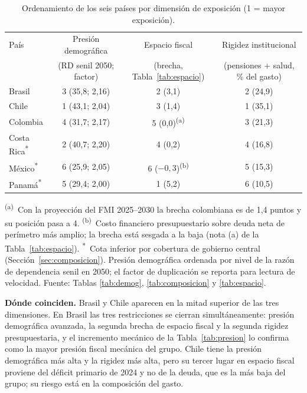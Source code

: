 \documentclass[12pt, letterpaper]{article}
\begin{document}
\begin{table}[htbp]
  \centering
  \caption{Ordenamiento de los seis países por dimensión de exposición (1 = mayor
  exposición).}
  \label{tab:sintesis}
  \small
  \begin{tabular}{lccc}
    \toprule
    País & Presión demográfica & Espacio fiscal & Rigidez institucional \\
         & (RD senil 2050; factor) & (brecha, Tabla~\ref{tab:espacio}) & (pensiones + salud, \% del gasto) \\
    \midrule
    Brasil     & 3 (35,8; 2,16) & 2 (3,1) & 2 (24,9) \\
    Chile      & 1 (43,1; 2,04) & 3 (1,4) & 1 (35,1) \\
    Colombia   & 4 (31,7; 2,17) & 5 (0,0)\textsuperscript{(a)} & 3 (21,3) \\
    Costa Rica\textsuperscript{*} & 2 (40,7; 2,20) & 4 (0,2) & 4 (16,8) \\
    México\textsuperscript{*}     & 6 (25,9; 2,05) & 6 ($-0{,}3$)\textsuperscript{(b)} & 5 (15,3) \\
    Panamá\textsuperscript{*}     & 5 (29,4; 2,00) & 1 (5,2) & 6 (10,5) \\
    \bottomrule
  \end{tabular}

  \vspace{2pt}
  \footnotesize
  \textsuperscript{(a)}~Con la proyección del FMI 2025--2030 la brecha colombiana es
  de 1,4 puntos y su posición pasa a 4. \textsuperscript{(b)}~Costo financiero
  presupuestario sobre deuda neta de perímetro más amplio; la brecha está sesgada a
  la baja (nota (a) de la Tabla~\ref{tab:espacio}). \textsuperscript{*}~Cota inferior por
  cobertura de gobierno central (Sección~\ref{sec:composicion}). Presión
  demográfica ordenada por nivel de la razón de dependencia senil en 2050; el
  factor de duplicación se reporta para lectura de velocidad. Fuente: Tablas
  \ref{tab:demog}, \ref{tab:composicion} y \ref{tab:espacio}.
\end{table}

\textbf{Dónde coinciden.} Brasil y Chile aparecen en la mitad superior de las tres
dimensiones. En Brasil las tres restricciones se cierran simultáneamente: presión
demográfica avanzada, la segunda brecha de espacio fiscal y la segunda rigidez
presupuestaria, y el incremento mecánico de la Tabla~\ref{tab:presion} lo confirma
como la mayor presión fiscal mecánica del grupo. Chile tiene la presión demográfica
más alta y la rigidez más alta, pero su tercer lugar en espacio fiscal proviene del
déficit primario de 2024 y no de la deuda, que es la más baja del grupo; su riesgo
está en la composición del gasto.
\end{document}
